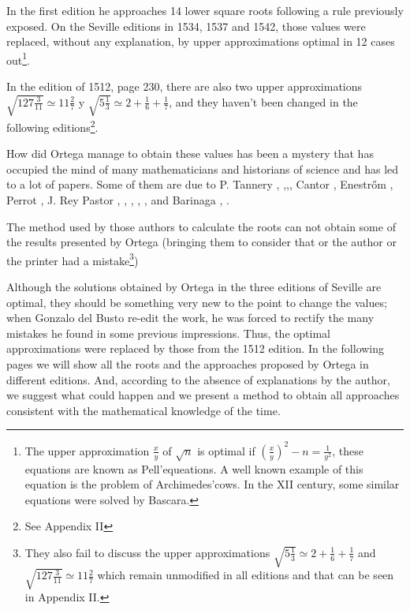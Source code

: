 \documentclass{amsart}
\begin{document}
In the first edition he approaches 14 lower square roots following a rule previously exposed.  On the Seville editions in 1534, 1537 and 1542, those values were replaced, without any explanation, by upper approximations optimal in 12 cases out\footnote{The upper approximation  $\frac xy$ of $\sqrt{n}$ is optimal if $(\frac xy)^2-n=\frac {1}{y^2}$, these equations are known as Pell'equeations. A well known example of this equation is the problem of Archimedes'cows. In the XII century, some similar equations were solved by Bascara.}.

In the edition of 1512, page 230, there are also two upper approximations $\sqrt{127\frac{3}{11}}\simeq 11\frac{2}{7}$ y $\sqrt{5\frac 13}\simeq 2+\frac 16+\frac 17$, and they haven't been changed in the following editions\footnote{See Appendix II}.

How did Ortega manage to obtain these values has been a mystery that has occupied  the mind of many mathematicians and historians of science and has led to a lot of papers. Some of them are due to P. Tannery \cite{tan1}, \cite{tan2},\cite{tan3},\cite{tan},  Cantor \cite{can}, Enestr\H{o}m \cite{ene}, Perrot \cite{pert}, J. Rey Pastor \cite{rey1}, \cite{rey2}, \cite{rey3}, \cite{rey4}, \cite{rey5}, and Barinaga \cite{bar1}, \cite{bar2}.

The method used by those authors to calculate the roots can not obtain some of the results presented by Ortega (bringing them to consider that or the author or the printer had a mistake\footnote{They also fail to discuss the upper approximations $\sqrt{5\frac 13}\simeq 2+\frac 16+\frac 17$ and $\sqrt{127\frac{3}{11}}\simeq 11\frac{2}{7}$ which remain unmodified in all editions and that can be seen in Appendix II.})

Although the solutions obtained by Ortega in the three editions of Seville are optimal, they should be something very new to the point to change the values; when Gonzalo del Busto re-edit the work, he was forced to rectify the many mistakes he found in some previous impressions. Thus, the optimal approximations were replaced by those from the 1512 edition.
In the following pages we will show all the roots and the approaches proposed by Ortega in different editions. And, according to the absence of explanations by the author, we suggest what could happen and we present a method to obtain all approaches consistent with the mathematical knowledge of the time.
\end{document}
